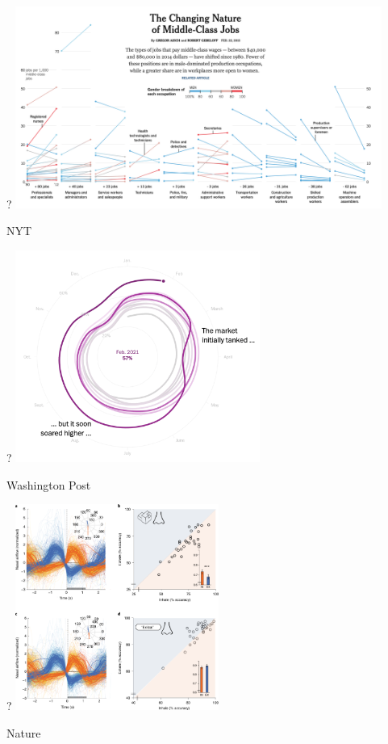 \documentclass[notes, aspectratio=1610]{beamer}
\begin{document}
\begin{frame}{?}{}
	\centering
	\includegraphics[width=0.9\textwidth]{images/nyt_0.png}
	\pause

	NYT
\end{frame}


\begin{frame}{?}{}
	\centering
	\includegraphics[width=0.6\textwidth]{images/wp_0.png}
	\pause

	Washington Post
\end{frame}


\begin{frame}{?}{}
	\centering
	\includegraphics[width=0.5\textwidth]{images/nature_2.png}
	\pause

	Nature
\end{frame}
\end{document}
